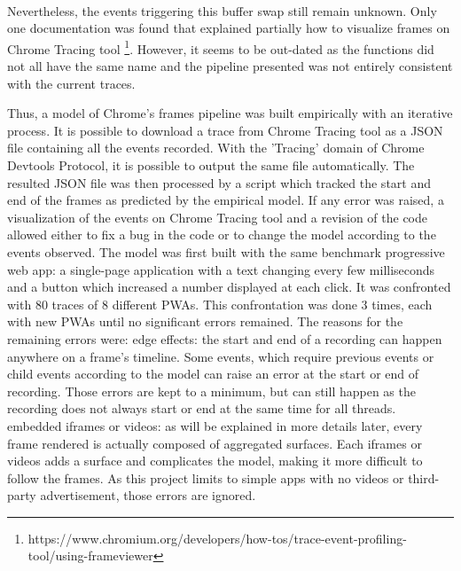 \documentclass{kththesis}
\begin{document}
\paragraph{}
Nevertheless, the events triggering this buffer swap still remain unknown. Only one documentation was found that explained partially how to visualize frames on Chrome Tracing tool \footnote{https://www.chromium.org/developers/how-tos/trace-event-profiling-tool/using-frameviewer}. However, it seems to be out-dated as the functions did not all have the same name and the pipeline presented was not entirely consistent with the current traces. 


\color{blue}
Thus, a model of Chrome's frames pipeline was built empirically with an iterative process. It is possible to download a trace from Chrome Tracing tool as a JSON file containing all the events recorded. With the 'Tracing' domain of Chrome Devtools Protocol, it is possible to output the same file automatically. The resulted JSON file was then processed by a script which tracked the start and end of the frames as predicted by the empirical model. If any error was raised, a visualization of the events on Chrome Tracing tool and a revision of the code allowed either to fix a bug in the code or to change the model according to the events observed. \newline
The model was first built with the same benchmark progressive web app: a single-page application with a text changing every few milliseconds and a button which increased a number displayed at each click. It was confronted with 80 traces of 8 different PWAs. This confrontation was done 3 times, each with new PWAs until no significant errors remained. The reasons for the remaining errors were: \newline
\textendash  edge effects: the start and end of a recording can happen anywhere on a frame's timeline. Some events, which require previous events or child events according to the model can raise an error at the start or end of recording. Those errors are kept to a minimum, but can still happen as the recording does not always start or end at the same time for all threads. \newline
\textendash  embedded iframes or videos: as will be explained in more details later, every frame rendered is actually composed of aggregated surfaces. Each iframes or videos adds a surface and complicates the model, making it more difficult to follow the frames. As this project limits to simple apps with no videos or third-party advertisement, those errors are ignored. 
\end{document}
